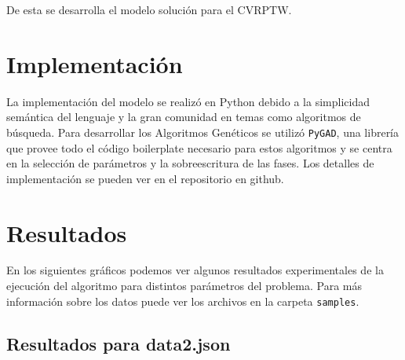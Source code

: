 \documentclass[12pt]{llncs}
\begin{document}
De esta se desarrolla el modelo solución para el CVRPTW.

\section*{Implementación}

La implementación del modelo se realizó en Python debido a la simplicidad semántica del lenguaje y la gran comunidad en temas como algoritmos de búsqueda. Para desarrollar los Algoritmos Genéticos se utilizó \verb+PyGAD+, una librería que provee todo el código boilerplate necesario para estos algoritmos y se centra en la selección de parámetros y la sobreescritura de las fases. Los detalles de implementación se pueden ver en el repositorio en github.

\section*{Resultados}

En los siguientes gráficos podemos ver algunos resultados experimentales de la ejecución del algoritmo para distintos parámetros del problema. Para más información sobre los datos puede ver los archivos en la carpeta \verb+samples+.

\subsection*{Resultados para data2.json}
\end{document}
